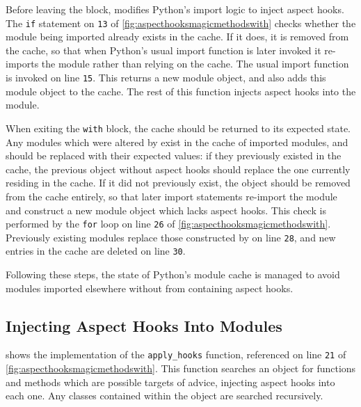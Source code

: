 Before leaving the block, \pdsfthree{} modifies Python's import logic to inject
aspect hooks. The \lstinline{if} statement on \texttt{13} of
\cref{fig:aspecthooksmagicmethodswith} checks whether the module being imported
already exists in the cache. If it does, it is removed from the cache, so that
when Python's usual import function is later invoked it re-imports the module
rather than relying on the cache. The usual import function is invoked on line
\texttt{15}. This returns a new module object, and also adds this module object
to the cache. The rest of this function injects aspect hooks into the module.

When exiting the \lstinline{with} block, the cache should be returned to its
expected state. Any modules which were altered by \pdsfthree{} exist in the cache of
imported modules, and should be replaced with their expected values: if they
previously existed in the cache, the previous object without aspect hooks should
replace the one currently residing in the cache. If it did not previously exist,
the object should be removed from the cache entirely, so that later import
statements re-import the module and construct a new module object which lacks
aspect hooks. This check is performed by the \lstinline{for} loop on line
\texttt{26} of \cref{fig:aspecthooksmagicmethodswith}. Previously existing
modules replace those constructed by \pdsfthree{} on line \texttt{28}, and new
entries in the cache are deleted on line \texttt{30}.

Following these steps, the state of Python's module cache is managed to avoid
modules imported elsewhere without \pdsfthree{} from containing aspect hooks.

\subsection{Injecting Aspect Hooks Into Modules}
\label{injecting_aspect_hooks_when_importing}

 shows the implementation of the
\lstinline{apply_hooks} function, referenced on line \texttt{21} of
\cref{fig:aspecthooksmagicmethodswith}. This function searches an
object for functions and methods which are possible targets of advice, injecting
aspect hooks into each one. Any classes contained within the object are searched
recursively.


